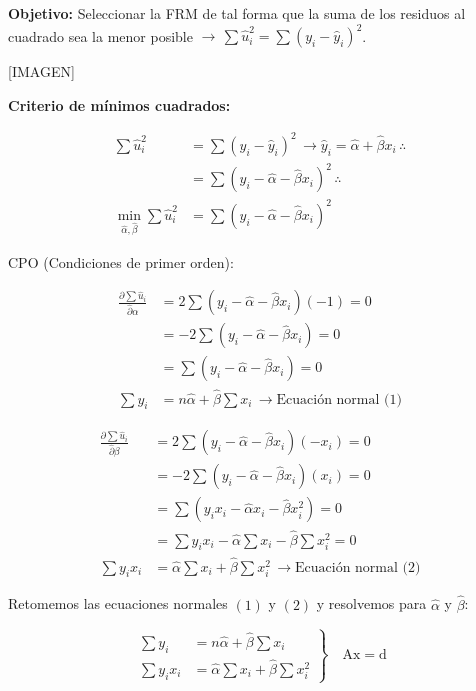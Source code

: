 \documentclass[
]{book}
\begin{document}
\textbf{Objetivo:} Seleccionar la FRM de tal forma que la suma de los residuos al cuadrado sea la menor posible \(\rightarrow \, \sum \hat u_i^2 = \sum (y_i - \hat y_i)^2\).

{[}IMAGEN{]}

\textbf{Criterio de mínimos cuadrados:}

\[
\begin{aligned}
\sum \hat u_i^2 &= \sum (y_i - \hat y_i)^2 \, \rightarrow \hat y_i = \hat \alpha + \hat \beta x_i \, \therefore \\
&= \sum(y_i - \hat \alpha - \hat \beta x_i)^2 \, \therefore \\
 \min_{\hat \alpha, \hat \beta} \sum \hat u_i^2 &= \sum(y_i - \hat \alpha - \hat \beta x_i)^2
\end{aligned}
\]

CPO (Condiciones de primer orden):

\[
\begin{aligned}
\frac{ \partial \sum \hat{u}_{i} }{ \hat{\partial} \alpha } &= 2 \sum (y_{i} - \hat{\alpha } - \hat{\beta}x_{i})(-1) = 0  \\
&= -2 \sum (y_{i} - \hat{\alpha } - \hat{\beta}x_{i}) = 0 \\
&= \sum (y_{i} - \hat{\alpha } - \hat{\beta}x_{i}) = 0 \\
\sum y_{i} &= n \hat{\alpha } + \hat{\beta}\sum x_{i} \, \rightarrow \text{Ecuación normal (1)}
\end{aligned}
\]

\[
\begin{aligned}
\frac{ \partial \sum \hat{u}_{i} }{ \hat{\partial} \beta } &= 2 \sum (y_{i} - \hat{\alpha } - \hat{\beta}x_{i})(-x_{i}) = 0  \\
&= -2 \sum (y_{i} - \hat{\alpha } - \hat{\beta}x_{i})(x_{i}) = 0 \\
&= \sum (y_{i}x_{i} - \hat{\alpha } x_{i} - \hat{\beta}x_{i}^2) = 0 \\
&= \sum y_{i}x_{i} - \hat{\alpha }\sum x_{i} - \hat{\beta}\sum x_{i}^2 = 0 \\
\sum y_{i}x_{i} &= \hat{\alpha }\sum x_{i} + \hat{\beta}\sum x_{i}^2 \, \rightarrow \text{Ecuación normal (2)}
\end{aligned}
\]

Retomemos las ecuaciones normales \((1)\) y \((2)\) y resolvemos para \(\hat \alpha\) y \(\hat \beta\):

\[
\left .  
\begin{aligned}  
\sum y_{i} &= n \hat{\alpha } + \hat{\beta}\sum x_{i} \\
\sum y_{i}x_{i} &= \hat{\alpha }\sum x_{i} + \hat{\beta}\sum x_{i}^2 
\end{aligned} 
\right\}  
\quad \mathrm{Ax = d}
\]
\end{document}
